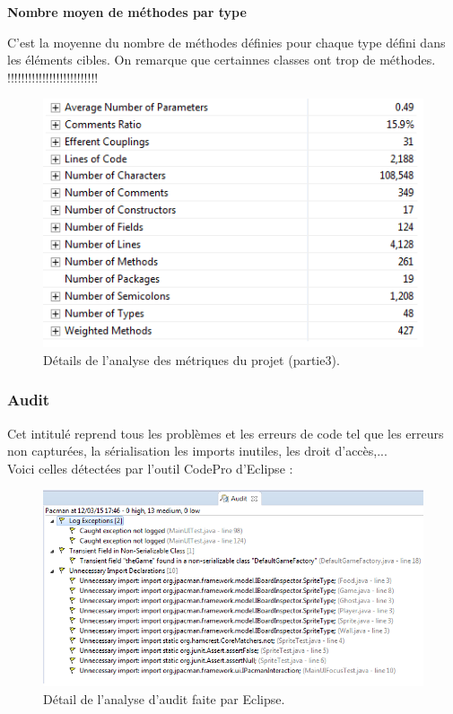 \documentclass[12pt,a4paper,final]{article}
\newcommand{\smalltitle}[1]{\bigskip\large\textbf{#1}\par\normalsize\medskip}
\begin{document}
\smalltitle{Nombre moyen de méthodes par type}
C'est la moyenne du nombre de méthodes définies pour chaque type défini dans les éléments cibles.
On remarque que certainnes classes ont trop de méthodes.
!!!!!!!!!!!!!!!!!!!!!!!!!!
\begin{figure}[!h]
	\centering
	\includegraphics{Metrique2.png}
	\caption{\label{métrique2}Détails de l'analyse des métriques du projet (partie3).}
\end{figure}


\clearpage
\subsubsection{Audit}
Cet intitulé reprend tous les problèmes et les erreurs de code tel que les erreurs non capturées, la sérialisation les imports inutiles, les droit d'accès,...\\
Voici celles détectées par l'outil CodePro d'Eclipse : 
\begin{figure}[!h]
	\centering
	\includegraphics[width=\textwidth]{Audit.png}
	\caption{\label{Audit}Détail de l'analyse d'audit faite par Eclipse.}
\end{figure}
\end{document}
